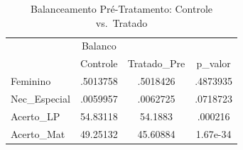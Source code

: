 \begin{table}[htbp]\centering
\caption{Balanceamento Pré-Tratamento: Controle vs.\ Tratado}
\begin{tabular}{l*{3}{c}}
\toprule
            &     Balanco&            &            \\
            &    Controle& Tratado\_Pre&     p\_valor\\
\midrule
Feminino    &    .5013758&    .5018426&    .4873935\\
Nec\_Especial&    .0059957&    .0062725&    .0718723\\
Acerto\_LP   &    54.83118&     54.1883&     .000216\\
Acerto\_Mat  &    49.25132&    45.60884&    1.67e-34\\
\bottomrule
\end{tabular}
\end{table}
